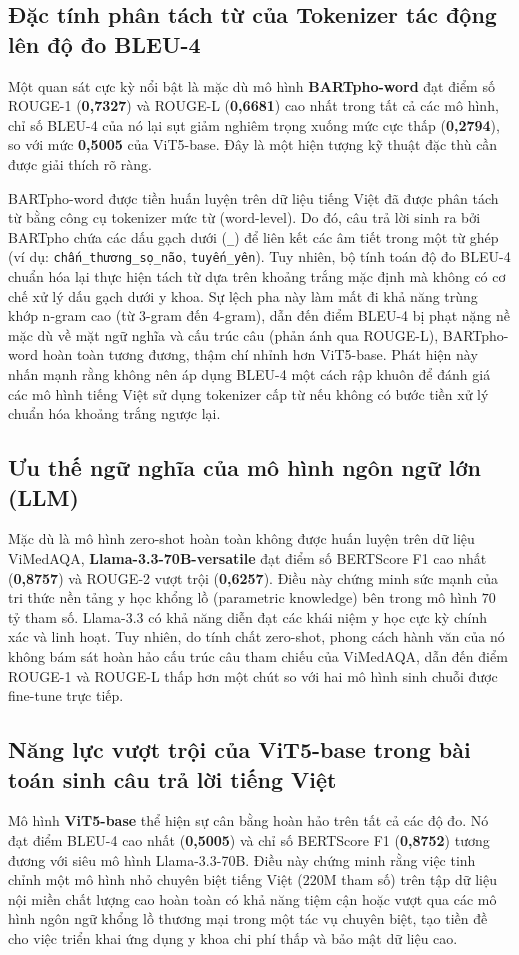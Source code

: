\subsection{Đặc tính phân tách từ của Tokenizer tác động lên độ đo BLEU-4}
Một quan sát cực kỳ nổi bật là mặc dù mô hình \textbf{BARTpho-word} đạt điểm số ROUGE-1 (\textbf{0,7327}) và ROUGE-L (\textbf{0,6681}) cao nhất trong tất cả các mô hình, chỉ số BLEU-4 của nó lại sụt giảm nghiêm trọng xuống mức cực thấp (\textbf{0,2794}), so với mức \textbf{0,5005} của ViT5-base. Đây là một hiện tượng kỹ thuật đặc thù cần được giải thích rõ ràng. 

BARTpho-word được tiền huấn luyện trên dữ liệu tiếng Việt đã được phân tách từ bằng công cụ tokenizer mức từ (word-level). Do đó, câu trả lời sinh ra bởi BARTpho chứa các dấu gạch dưới (\texttt{\_}) để liên kết các âm tiết trong một từ ghép (ví dụ: \texttt{chấn\_thương\_sọ\_não}, \texttt{tuyến\_yên}). Tuy nhiên, bộ tính toán độ đo BLEU-4 chuẩn hóa lại thực hiện tách từ dựa trên khoảng trắng mặc định mà không có cơ chế xử lý dấu gạch dưới y khoa. Sự lệch pha này làm mất đi khả năng trùng khớp n-gram cao (từ 3-gram đến 4-gram), dẫn đến điểm BLEU-4 bị phạt nặng nề mặc dù về mặt ngữ nghĩa và cấu trúc câu (phản ánh qua ROUGE-L), BARTpho-word hoàn toàn tương đương, thậm chí nhỉnh hơn ViT5-base. Phát hiện này nhấn mạnh rằng không nên áp dụng BLEU-4 một cách rập khuôn để đánh giá các mô hình tiếng Việt sử dụng tokenizer cấp từ nếu không có bước tiền xử lý chuẩn hóa khoảng trắng ngược lại.

\subsection{Ưu thế ngữ nghĩa của mô hình ngôn ngữ lớn (LLM)}
Mặc dù là mô hình zero-shot hoàn toàn không được huấn luyện trên dữ liệu ViMedAQA, \textbf{Llama-3.3-70B-versatile} đạt điểm số BERTScore F1 cao nhất (\textbf{0,8757}) và ROUGE-2 vượt trội (\textbf{0,6257}). Điều này chứng minh sức mạnh của tri thức nền tảng y học khổng lồ (parametric knowledge) bên trong mô hình $70$ tỷ tham số. Llama-3.3 có khả năng diễn đạt các khái niệm y học cực kỳ chính xác và linh hoạt. Tuy nhiên, do tính chất zero-shot, phong cách hành văn của nó không bám sát hoàn hảo cấu trúc câu tham chiếu của ViMedAQA, dẫn đến điểm ROUGE-1 và ROUGE-L thấp hơn một chút so với hai mô hình sinh chuỗi được fine-tune trực tiếp.

\subsection{Năng lực vượt trội của ViT5-base trong bài toán sinh câu trả lời tiếng Việt}
Mô hình \textbf{ViT5-base} thể hiện sự cân bằng hoàn hảo trên tất cả các độ đo. Nó đạt điểm BLEU-4 cao nhất (\textbf{0,5005}) và chỉ số BERTScore F1 (\textbf{0,8752}) tương đương với siêu mô hình Llama-3.3-70B. Điều này chứng minh rằng việc tinh chỉnh một mô hình nhỏ chuyên biệt tiếng Việt ($220$M tham số) trên tập dữ liệu nội miền chất lượng cao hoàn toàn có khả năng tiệm cận hoặc vượt qua các mô hình ngôn ngữ khổng lồ thương mại trong một tác vụ chuyên biệt, tạo tiền đề cho việc triển khai ứng dụng y khoa chi phí thấp và bảo mật dữ liệu cao.

